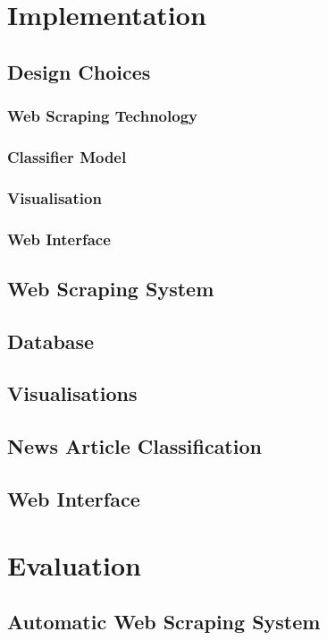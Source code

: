 \documentclass{l4proj}
\begin{document}
\chapter{Implementation}
\section{Design Choices}
\subsection{Web Scraping Technology}
\subsection{Classifier Model}
\subsection{Visualisation}
\subsection{Web Interface}
\section{Web Scraping System}
\section{Database}
\section{Visualisations}
\section{News Article Classification}
\section{Web Interface}
\chapter{Evaluation}
\section{Automatic Web Scraping System}
\end{document}

